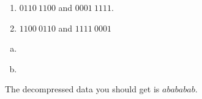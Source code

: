 \begin{Answer}[ref={bit-packing-order}]

  \begin{enumerate}[a]
  \item $0110\ 1100$ and $0001\ 1111$.
  \item $1100 \ 0110$ and $1111 \ 0001$
  \end{enumerate}

\end{Answer}

\begin{Answer}[ref={firstnbits}]

  \begin{enumerate}[(a)]
  \item

    \begin{algorithmic}[1]
      \EndProcedure
    \end{algorithmic}

  \item

    \begin{algorithmic}[1]
      \EndProcedure
    \end{algorithmic}


  \end{enumerate}

\end{Answer}

\begin{Answer}[ref={lzw-decompress}]

  The decompressed data you should get is $abababab$.

\end{Answer}